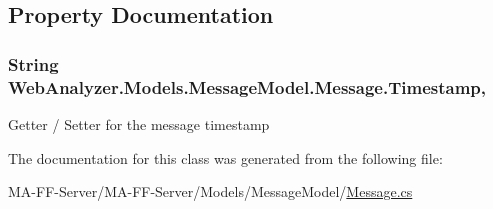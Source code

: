 \subsection{Property Documentation}
\hypertarget{class_web_analyzer_1_1_models_1_1_message_model_1_1_message_a9054d90256bf9ad8de33d975d2a188d3}{}
\subsubsection[{Timestamp}]{\setlength{\rightskip}{0pt plus 5cm}String Web\+Analyzer.\+Models.\+Message\+Model.\+Message.\+Timestamp\hspace{0.3cm}{\ttfamily [get]}, {\ttfamily [set]}}\label{class_web_analyzer_1_1_models_1_1_message_model_1_1_message_a9054d90256bf9ad8de33d975d2a188d3}


Getter / Setter for the message timestamp 



The documentation for this class was generated from the following file\+:\begin{DoxyCompactItemize}
\item 
M\+A-\/\+F\+F-\/\+Server/\+M\+A-\/\+F\+F-\/\+Server/\+Models/\+Message\+Model/\hyperlink{_message_8cs}{Message.\+cs}\end{DoxyCompactItemize}
